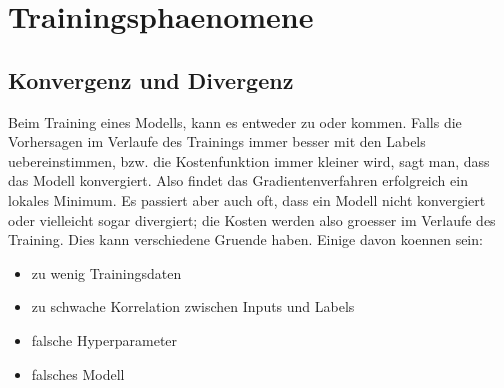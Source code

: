 \cite{Nielsen}

\section{Trainingsphaenomene}

\subsection{Konvergenz und Divergenz}
Beim Training eines Modells, kann es entweder zu  oder  kommen.
Falls die Vorhersagen im Verlaufe des Trainings immer besser mit den Labels
uebereinstimmen, bzw. die Kostenfunktion immer kleiner wird, sagt man, dass das
Modell konvergiert. Also findet das Gradientenverfahren erfolgreich ein lokales Minimum.
\para{}
Es passiert aber auch oft, dass ein Modell nicht konvergiert oder vielleicht
sogar divergiert; die Kosten werden also groesser im Verlaufe des Training.
Dies kann verschiedene Gruende haben. Einige davon koennen sein:
\begin{itemize}
  \item{zu wenig Trainingsdaten}
  \item{zu schwache Korrelation zwischen Inputs und Labels}
  \item{falsche Hyperparameter}
  \item{falsches Modell}
\end{itemize}


